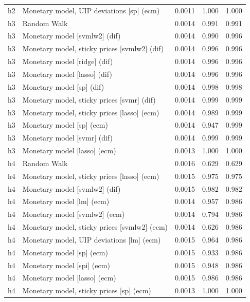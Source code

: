 \begin{ThreePartTable}
\begin{longtable}[t]{cp{5.5cm}ccc}
h2 & \raggedright Monetary model, UIP deviations [sp] (ecm) & 0.0011 & 1.000 & 1.000\\
\addlinespace
h3 & \raggedright Random Walk & 0.0014 & 0.991 & 0.991\\
h3 & \raggedright Monetary model [svmlw2] (dif) & 0.0014 & 0.990 & 0.996\\
h3 & \raggedright Monetary model, sticky prices [svmlw2] (dif) & 0.0014 & 0.996 & 0.996\\
h3 & \raggedright Monetary model [ridge] (dif) & 0.0014 & 0.996 & 0.996\\
h3 & \raggedright Monetary model [lasso] (dif) & 0.0014 & 0.996 & 0.996\\
h3 & \raggedright Monetary model [sp] (dif) & 0.0014 & 0.998 & 0.998\\
h3 & \raggedright Monetary model, sticky prices [svmr] (dif) & 0.0014 & 0.999 & 0.999\\
h3 & \raggedright Monetary model, sticky prices [lasso] (ecm) & 0.0014 & 0.989 & 0.999\\
h3 & \raggedright Monetary model [sp] (ecm) & 0.0014 & 0.947 & 0.999\\
h3 & \raggedright Monetary model [svmr] (dif) & 0.0014 & 0.999 & 0.999\\
h3 & \raggedright Monetary model [lasso] (ecm) & 0.0013 & 1.000 & 1.000\\
\addlinespace
h4 & \raggedright Random Walk & 0.0016 & 0.629 & 0.629\\
h4 & \raggedright Monetary model, sticky prices [lasso] (ecm) & 0.0015 & 0.975 & 0.975\\
h4 & \raggedright Monetary model [svmlw2] (dif) & 0.0015 & 0.982 & 0.982\\
h4 & \raggedright Monetary model [lm] (ecm) & 0.0014 & 0.957 & 0.986\\
h4 & \raggedright Monetary model [svmlw2] (ecm) & 0.0014 & 0.794 & 0.986\\
h4 & \raggedright Monetary model, sticky prices [svmlw2] (ecm) & 0.0014 & 0.626 & 0.986\\
h4 & \raggedright Monetary model, UIP deviations [lm] (ecm) & 0.0015 & 0.964 & 0.986\\
h4 & \raggedright Monetary model [sp] (ecm) & 0.0015 & 0.933 & 0.986\\
h4 & \raggedright Monetary model [spi] (ecm) & 0.0015 & 0.948 & 0.986\\
h4 & \raggedright Monetary model [lasso] (ecm) & 0.0015 & 0.986 & 0.986\\
h4 & \raggedright Monetary model, sticky prices [sp] (ecm) & 0.0013 & 1.000 & 1.000\\

\end{longtable}
\end{ThreePartTable}
